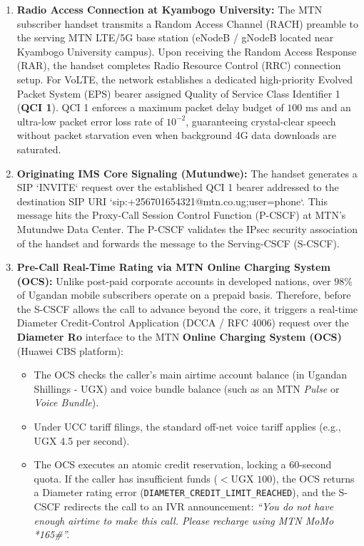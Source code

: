 \documentclass[12pt,a4paper]{report}
\begin{document}
\begin{enumerate}
    \item \textbf{Radio Access Connection at Kyambogo University:}
    The MTN subscriber handset transmits a Random Access Channel (RACH) preamble to the serving MTN LTE/5G base station (eNodeB / gNodeB located near Kyambogo University campus). Upon receiving the Random Access Response (RAR), the handset completes Radio Resource Control (RRC) connection setup. For VoLTE, the network establishes a dedicated high-priority Evolved Packet System (EPS) bearer assigned Quality of Service Class Identifier 1 (\textbf{QCI 1}). QCI 1 enforces a maximum packet delay budget of $100\text{ ms}$ and an ultra-low packet error loss rate of $10^{-2}$, guaranteeing crystal-clear speech without packet starvation even when background 4G data downloads are saturated.

    \item \textbf{Originating IMS Core Signaling (Mutundwe):}
    The handset generates a SIP `INVITE` request over the established QCI 1 bearer addressed to the destination SIP URI `sip:+256701654321@mtn.co.ug;user=phone`. This message hits the Proxy-Call Session Control Function (P-CSCF) at MTN's Mutundwe Data Center. The P-CSCF validates the IPsec security association of the handset and forwards the message to the Serving-CSCF (S-CSCF).

    \item \textbf{Pre-Call Real-Time Rating via MTN Online Charging System (OCS):}
    Unlike post-paid corporate accounts in developed nations, over $98\%$ of Ugandan mobile subscribers operate on a prepaid basis. Therefore, before the S-CSCF allows the call to advance beyond the core, it triggers a real-time Diameter Credit-Control Application (DCCA / RFC 4006) request over the \textbf{Diameter Ro} interface to the MTN \textbf{Online Charging System (OCS)} (Huawei CBS platform):
    \begin{itemize}
        \item The OCS checks the caller's main airtime account balance (in Ugandan Shillings - UGX) and voice bundle balance (such as an MTN \textit{Pulse} or \textit{Voice Bundle}).
        \item Under UCC tariff filings, the standard off-net voice tariff applies (e.g., UGX 4.5 per second).
        \item The OCS executes an atomic credit reservation, locking a 60-second quota. If the caller has insufficient funds ($<\text{UGX } 100$), the OCS returns a Diameter rating error (\texttt{DIAMETER\_CREDIT\_LIMIT\_REACHED}), and the S-CSCF redirects the call to an IVR announcement: \textit{``You do not have enough airtime to make this call. Please recharge using MTN MoMo *165\#''.}
    \end{itemize}


\end{enumerate}
\end{document}

